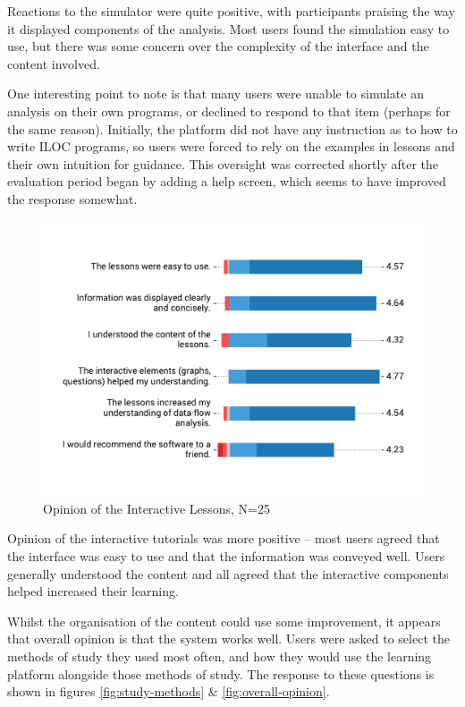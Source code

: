 \documentclass[bsc,twoside,singlespacing,parskip,logo,notimes,normalheadings]{infthesis}
\begin{document}
    Reactions to the simulator were quite positive, with participants
    praising the way it displayed components of the analysis. Most
    users found the simulation easy to use, but there was some concern
    over the complexity of the interface and the content involved.

    One interesting point to note is that many users were unable to
    simulate an analysis on their own programs, or declined to respond
    to that item (perhaps for the same reason). Initially, the
    platform did not have any instruction as to how to write ILOC
    programs, so users were forced to rely on the examples in lessons
    and their own intuition for guidance. This oversight was corrected
    shortly after the evaluation period began by adding a help screen,
    which seems to have improved the response somewhat.

    \begin{figure}[!htb]
      \centering
      \captionsetup{width=\textwidth, justification=centering}
      \caption{Opinion of the Interactive Lessons, N=25}\label{fig:opinion-lessons}
      \includegraphics[width=\textwidth, trim=0 50 0 50, clip]{img/lesson_opinion.pdf}
    \end{figure}

    Opinion of the interactive tutorials was more positive -- most
    users agreed that the interface was easy to use and that the
    information was conveyed well. Users generally understood the
    content and all agreed that the interactive components helped
    increased their learning.

    Whilst the organisation of the content could use some improvement,
    it appears that overall opinion is that the system works
    well. Users were asked to select the methods of study they used
    most often, and how they would use the learning platform alongside
    those methods of study. The response to these questions is shown
    in figures \ref{fig:study-methods} \& \ref{fig:overall-opinion}.
\end{document}
